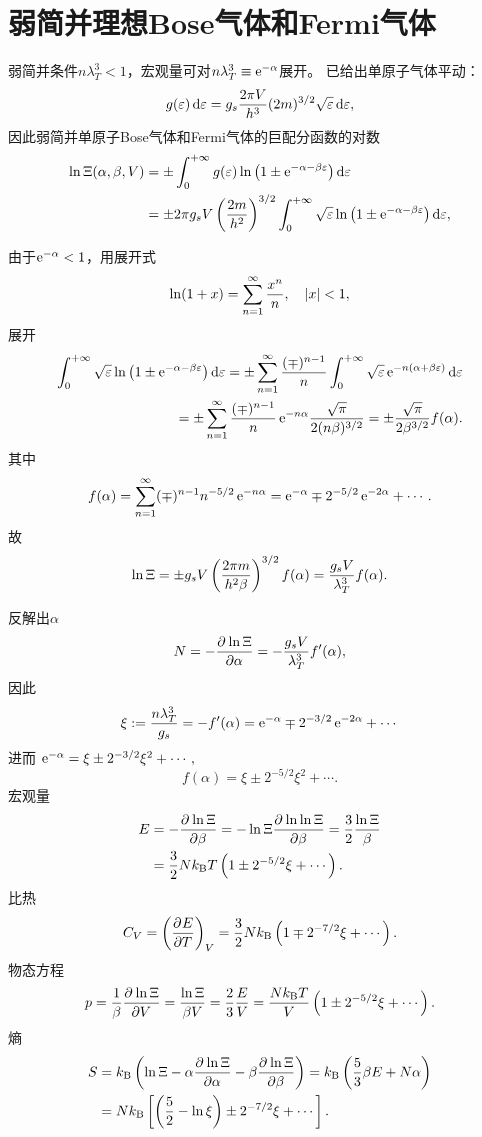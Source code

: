 \section{弱简并理想Bose气体和Fermi气体}
弱简并条件$n\lambda_T^3<1$，宏观量可对$n\lambda_T^3\equiv\mathop{}\!\mathrm{e}^{-\alpha}$展开。 已给出单原子气体平动：
\begin{align}
	g(\varepsilon)\mathop{}\!\mathrm{d}\varepsilon=g_s\frac{2\pi V}{h^3}(2m)^{3/2}\sqrt\varepsilon\mathop{}\!\mathrm{d}\varepsilon,
\end{align}
因此弱简并单原子Bose气体和Fermi气体的巨配分函数的对数
\begin{align*}
	\ln\Xi(\alpha,\beta,V) & =\pm\int_0^{+\infty} g(\varepsilon)\ln\left(1\pm\mathop{}\!\mathrm{e}^{-\alpha-\beta\varepsilon}\right)\mathop{}\!\mathrm{d}\varepsilon\\
	&=\pm 2\pi g_sV\left(\frac{2m}{h^2}\right)^{3/2}\int_0^{+\infty}\sqrt\varepsilon\ln\left(1\pm\mathop{}\!\mathrm{e}^{-\alpha-\beta\varepsilon}\right)\mathop{}\!\mathrm{d}\varepsilon,
\end{align*}

由于$\mathop{}\!\mathrm{e}^{-\alpha}<1$，用展开式
\[
	\ln(1+ x)=\sum_{n=1}^\infty\frac{x^n}n,\quad\left\lvert x\right\rvert<1,
\]
展开
\begin{align*}
	\int_0^{+\infty}\sqrt\varepsilon\ln\left(1\pm\mathop{}\!\mathrm{e}^{-\alpha-\beta\varepsilon}\right)\mathop{}\!\mathrm{d}\varepsilon=\pm\sum_{n=1}^\infty\frac{(\mp)^{n-1}}n\int_0^{+\infty}\sqrt\varepsilon\mathop{}\!\mathrm{e}^{-n(\alpha+\beta\varepsilon)}\mathop{}\!\mathrm{d}\varepsilon \\
	=\pm\sum_{n=1}^\infty\frac{(\mp )^{n-1}}n\mathop{}\!\mathrm{e}^{-n\alpha}\frac{\sqrt\pi}{2(n\beta)^{3/2}}=\pm\frac{\sqrt\pi}{2\beta^{3/2}}f(\alpha).
\end{align*}
其中
\[
	f(\alpha)=\sum_{n=1}^\infty(\mp)^{n-1}n^{-5/2}\mathop{}\!\mathrm{e}^{-n\alpha}=\mathop{}\!\mathrm{e}^{-\alpha}\mp 2^{-5/2}\mathop{}\!\mathrm{e}^{-2\alpha}+\cdots.
\]
故
\begin{align}
	\ln\Xi=\pm g_sV\left(\frac{2\pi m}{h^2\beta}\right)^{3/2}f(\alpha)=\frac{g_sV}{\lambda_T^3}f(\alpha).
\end{align}

反解出$\alpha$
\[
	N=-\frac{\partial^{{}}\ln\Xi}{\partial{\alpha}^{{}}}=-\frac{g_sV}{\lambda_T^3}f'(\alpha),
\]
因此
\[
	\xi:=\frac{n\lambda_T^3}{g_s}=-f'(\alpha)=\mathop{}\!\mathrm{e}^{-\alpha}\mp 2^{-3/2}\mathop{}\!\mathrm{e}^{-2\alpha}+\cdots
\]
进而
\(\mathop{}\!\mathrm{e}^{-\alpha}=\xi\pm{2^{-3/2}}\xi^2+\cdots,\)
\[
	f(\alpha)=\xi\pm 2^{-5/2}\xi^2+\cdots.
\]
宏观量
\begin{align}\notag
	E & =-\frac{\partial^{{}}\ln\Xi}{\partial{\beta}^{{}}}=-\ln\Xi\frac{\partial^{{}}\ln\ln\Xi}{\partial{\beta}^{{}}}=\frac32\frac{\ln\Xi}\beta \\
	  & =\frac32Nk_{\mathrm B} T\left(1\pm 2^{-5/2}\xi+\cdots\right).
\end{align}
比热
\begin{align}
	C_V=\left(\frac{\partial^{{}}E}{\partial{T}^{{}}}\right)_V=\frac32Nk_{\mathrm B}\left(1\mp 2^{-7/2}\xi+\cdots\right).
\end{align}
物态方程
\begin{align}
	p=\frac1\beta\frac{\partial^{{}}\ln\Xi}{\partial{V}^{{}}}=\frac{\ln\Xi}{\beta V}=\frac23\frac EV=\frac{Nk_{\mathrm B} T}V\left(1\pm 2^{-5/2}\xi+\cdots\right).
\end{align}
熵
\begin{align}\notag
	S&=k_{\mathrm B}\left(\ln\Xi-\alpha\frac{\partial^{{}}\ln\Xi}{\partial{\alpha}^{{}}}-\beta\frac{\partial^{{}}\ln\Xi}{\partial{\beta}^{{}}}\right)=k_{\mathrm B}\left(\frac53\beta E+N\alpha\right)\\
	&=Nk_{\mathrm B}\left[\left(\frac52-\ln\xi\right)\pm 2^{-7/2}\xi+\cdots\right].
\end{align}
